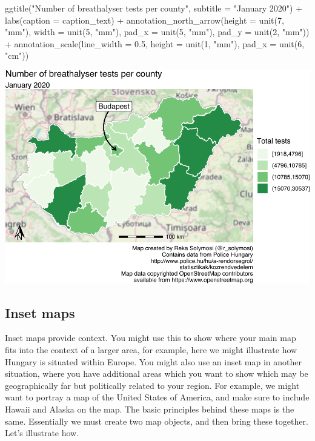 \documentclass[
]{book}
\newenvironment{Shaded}{\begin{snugshade}}{\end{snugshade}}
\newcommand{\AttributeTok}[1]{\textcolor[rgb]{0.77,0.63,0.00}{#1}}
\newcommand{\DecValTok}[1]{\textcolor[rgb]{0.00,0.00,0.81}{#1}}
\newcommand{\FloatTok}[1]{\textcolor[rgb]{0.00,0.00,0.81}{#1}}
\newcommand{\FunctionTok}[1]{\textcolor[rgb]{0.00,0.00,0.00}{#1}}
\newcommand{\NormalTok}[1]{#1}
\newcommand{\SpecialCharTok}[1]{\textcolor[rgb]{0.00,0.00,0.00}{#1}}
\newcommand{\StringTok}[1]{\textcolor[rgb]{0.31,0.60,0.02}{#1}}
\begin{document}
\begin{Shaded}
\begin{Highlighting}[]
  \FunctionTok{ggtitle}\NormalTok{(}\StringTok{"Number of breathalyser tests per county"}\NormalTok{, }\AttributeTok{subtitle =} \StringTok{"January 2020"}\NormalTok{) }\SpecialCharTok{+} 
  \FunctionTok{labs}\NormalTok{(}\AttributeTok{caption =}\NormalTok{ caption\_text) }\SpecialCharTok{+} 
  \FunctionTok{annotation\_north\_arrow}\NormalTok{(}\AttributeTok{height =} \FunctionTok{unit}\NormalTok{(}\DecValTok{7}\NormalTok{, }\StringTok{"mm"}\NormalTok{), }\AttributeTok{width =} \FunctionTok{unit}\NormalTok{(}\DecValTok{5}\NormalTok{, }\StringTok{"mm"}\NormalTok{), }\AttributeTok{pad\_x =} \FunctionTok{unit}\NormalTok{(}\DecValTok{5}\NormalTok{, }\StringTok{"mm"}\NormalTok{), }\AttributeTok{pad\_y =} \FunctionTok{unit}\NormalTok{(}\DecValTok{2}\NormalTok{, }\StringTok{"mm"}\NormalTok{)) }\SpecialCharTok{+} 
  \FunctionTok{annotation\_scale}\NormalTok{(}\AttributeTok{line\_width =} \FloatTok{0.5}\NormalTok{, }\AttributeTok{height =} \FunctionTok{unit}\NormalTok{(}\DecValTok{1}\NormalTok{, }\StringTok{"mm"}\NormalTok{), }\AttributeTok{pad\_x =} \FunctionTok{unit}\NormalTok{(}\DecValTok{6}\NormalTok{, }\StringTok{"cm"}\NormalTok{)) }
\end{Highlighting}
\end{Shaded}

\includegraphics{crime_mapping_files/figure-latex/basemap-1.pdf}

\hypertarget{inset-maps}{%
\subsection{Inset maps}\label{inset-maps}}

Inset maps provide context. You might use this to show where your main map fits into the context of a larger area, for example, here we might illustrate how Hungary is situated within Europe. You might also use an inset map in another situation, where you have additional areas which you want to show which may be geographically far but politically related to your region. For example, we might want to portray a map of the United States of America, and make sure to include Hawaii and Alaska on the map. The basic principles behind these maps is the same. Essentially we must create two map objects, and then bring these together. Let's illustrate how.
\end{document}
